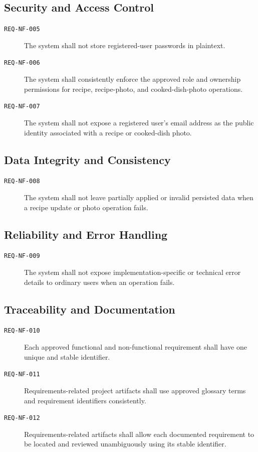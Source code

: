 \documentclass[12pt]{article}
\begin{document}
\subsection{Security and Access Control}
\begin{description}
    \item[\texttt{REQ-NF-005}] The system shall not store registered-user passwords in plaintext.
    \item[\texttt{REQ-NF-006}] The system shall consistently enforce the approved role and ownership permissions for recipe, recipe-photo, and cooked-dish-photo operations.
    \item[\texttt{REQ-NF-007}] The system shall not expose a registered user's email address as the public identity associated with a recipe or cooked-dish photo.
\end{description}

\subsection{Data Integrity and Consistency}
\begin{description}
    \item[\texttt{REQ-NF-008}] The system shall not leave partially applied or invalid persisted data when a recipe update or photo operation fails.
\end{description}

\subsection{Reliability and Error Handling}
\begin{description}
    \item[\texttt{REQ-NF-009}] The system shall not expose implementation-specific or technical error details to ordinary users when an operation fails.
\end{description}

\subsection{Traceability and Documentation}
\begin{description}
    \item[\texttt{REQ-NF-010}] Each approved functional and non-functional requirement shall have one unique and stable identifier.
    \item[\texttt{REQ-NF-011}] Requirements-related project artifacts shall use approved glossary terms and requirement identifiers consistently.
    \item[\texttt{REQ-NF-012}] Requirements-related artifacts shall allow each documented requirement to be located and reviewed unambiguously using its stable identifier.
\end{description}
\end{document}
